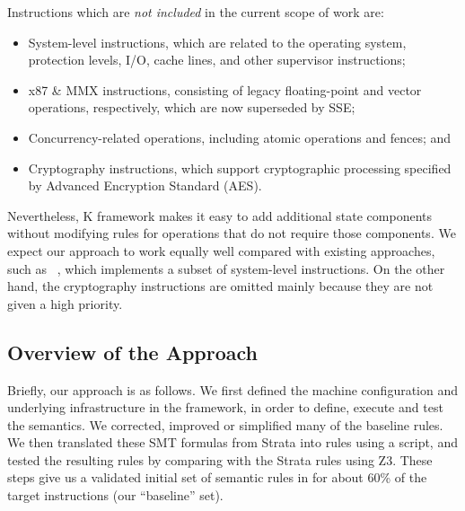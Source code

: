 Instructions which are \emph{not included} in the current scope of work are:
\begin{itemize}
\item System-level instructions, which are related to the operating system, 
protection levels, I/O, cache lines, and other supervisor instructions; 
\item x87 \& MMX instructions, consisting of legacy floating-point and 
vector operations, respectively, which are now superseded by SSE; 
\item Concurrency-related operations, including atomic operations and 
fences; and 
\item Cryptography instructions, which support cryptographic processing 
specified by Advanced Encryption Standard (AES). 
\end{itemize} 
%
Nevertheless, K framework makes it easy to add additional state components 
without modifying rules for operations that do not require those components. We 
expect our approach to work equally well compared with existing approaches, 
such as ~\cite{Goel:ProCoS17}, which implements a subset of system-level 
instructions. On the other hand, the cryptography instructions are omitted 
mainly because they are not given a high priority.

\subsection{Overview of the Approach}
\label{sec:Approach:Overview}

Briefly, our approach is as follows.
%
We first defined the machine configuration and underlying infrastructure in the \K framework, in order to define, execute and test the \ISA semantics.
%
%
We corrected, improved or simplified many of the baseline rules.
%
We then translated these SMT formulas from Strata into \K rules using a script, and tested the resulting rules by comparing with the Strata rules using Z3.
%
These steps give us a validated initial set of semantic rules in \K for about 60\% of the target instructions (our ``baseline'' set).

